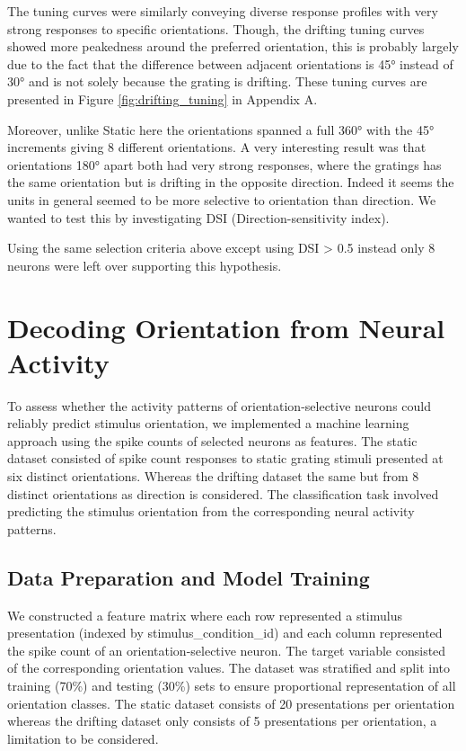 \documentclass[10pt,twocolumn]{article}
\begin{document}
The tuning curves were similarly conveying diverse response profiles with very strong responses to specific orientations. Though, the drifting tuning curves showed more peakedness around the preferred orientation, this is probably largely due to the fact that the difference between adjacent orientations is 45° instead of 30° and is not solely because the grating is drifting. These tuning curves are presented in Figure \ref{fig:drifting_tuning} in Appendix A.

Moreover, unlike Static here the orientations spanned a full 360° with the 45° increments giving 8 different orientations. A very interesting result was that orientations 180° apart both had very strong responses, where the gratings has the same orientation but is drifting in the opposite direction. Indeed it seems the units in general seemed to be more selective to orientation than direction. We wanted to test this by investigating DSI (Direction-sensitivity index).

Using the same selection criteria above except using DSI > 0.5 instead only 8 neurons were left over supporting this hypothesis.

\section{Decoding Orientation from Neural Activity}

To assess whether the activity patterns of orientation-selective neurons could reliably predict stimulus orientation, we implemented a machine learning approach using the spike counts of selected neurons as features. The static dataset consisted of spike count responses to static grating stimuli presented at six distinct orientations. Whereas the drifting dataset the same but from 8 distinct orientations as direction is considered. The classification task involved predicting the stimulus orientation from the corresponding neural activity patterns.

\subsection{Data Preparation and Model Training}
We constructed a feature matrix where each row represented a stimulus presentation (indexed by stimulus\_condition\_id) and each column represented the spike count of an orientation-selective neuron. The target variable consisted of the corresponding orientation values. The dataset was stratified and split into training (70\%) and testing (30\%) sets to ensure proportional representation of all orientation classes. The static dataset consists of 20 presentations per orientation whereas the drifting dataset only consists of 5 presentations per orientation, a limitation to be considered.
\end{document}

